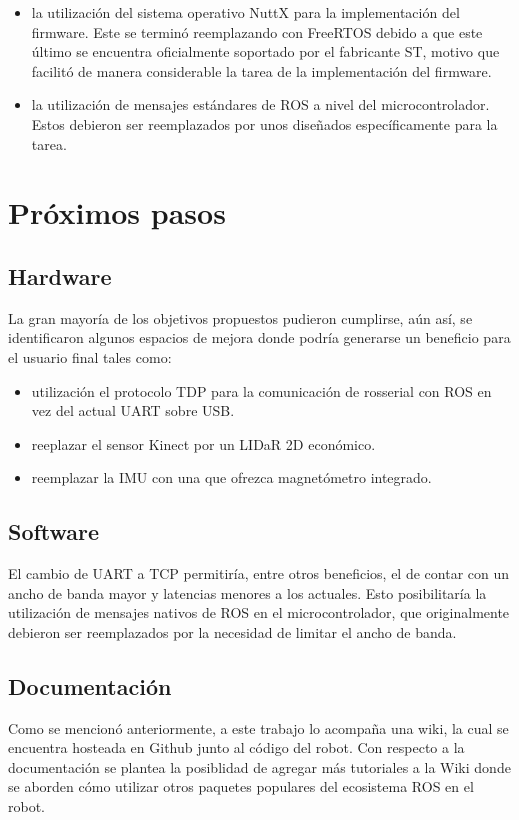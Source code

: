 \begin{itemize}
    \item la utilización del sistema operativo NuttX para la implementación del firmware. Este se terminó reemplazando con FreeRTOS debido a que este último se encuentra oficialmente soportado por el fabricante ST, motivo que facilitó de manera considerable la tarea de la implementación del firmware.
    \item la utilización de mensajes estándares de ROS a nivel del microcontrolador. Estos debieron ser reemplazados por unos diseñados específicamente para la tarea.
\end{itemize}

\section{Próximos pasos}

\subsection{Hardware}

La gran mayoría de los objetivos propuestos pudieron cumplirse, aún así, se identificaron algunos espacios de mejora donde podría generarse un beneficio para el usuario final tales como:

\begin{itemize}
    \item utilización el protocolo TDP para la comunicación de rosserial con ROS en vez del actual UART sobre USB.
    \item reeplazar el sensor Kinect por un LIDaR 2D económico.
    \item reemplazar la IMU con una que ofrezca magnetómetro integrado.
\end{itemize}

\subsection{Software}

El cambio de UART a TCP permitiría, entre otros beneficios, el de contar con un ancho de banda mayor y latencias menores a los actuales. Esto posibilitaría la utilización de mensajes nativos de ROS en el microcontrolador, que originalmente debieron ser reemplazados por la necesidad de limitar el ancho de banda.

\subsection{Documentación}

Como se mencionó anteriormente, a este trabajo lo acompaña una wiki, la cual se encuentra hosteada en Github junto al código del robot. Con respecto a la documentación se plantea la posiblidad de agregar más tutoriales a la Wiki donde se aborden cómo utilizar otros paquetes populares del ecosistema ROS en el robot.